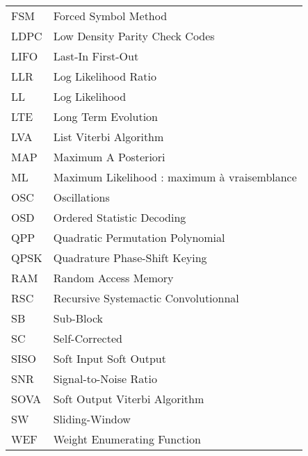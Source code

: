 \begin{center}
\begin{longtable}{ p{}  p{} }
FSM 		&   Forced Symbol Method																				\\
LDPC 		& 	Low Density Parity Check Codes	 																	\\
LIFO 		& 	Last-In First-Out																					\\
LLR 		&  	Log Likelihood Ratio	 																			\\
LL 	 		&  	Log Likelihood	 																					\\
LTE			& 	Long Term Evolution 																				\\
LVA			&	List Viterbi Algorithm	 																			\\
MAP			&   Maximum A Posteriori 																				\\
ML			&   Maximum Likelihood : maximum à vraisemblance 														\\
OSC			& 	Oscillations																						\\
OSD			& 	Ordered Statistic Decoding 																			\\
QPP			& 	Quadratic Permutation Polynomial	 																\\
QPSK		&	Quadrature Phase-Shift Keying																		\\
RAM			& 	Random Access Memory																				\\
RSC			& 	Recursive Systemactic Convolutionnal																\\
SB			&	Sub-Block																							\\
SC			&   Self-Corrected																						\\
SISO		&   Soft Input Soft Output																				\\
SNR			&	Signal-to-Noise Ratio																				\\
SOVA		&	Soft Output Viterbi Algorithm																		\\
SW			&	Sliding-Window																						\\
WEF			&   Weight Enumerating Function 																		\\


\end{longtable}

\end{center}

